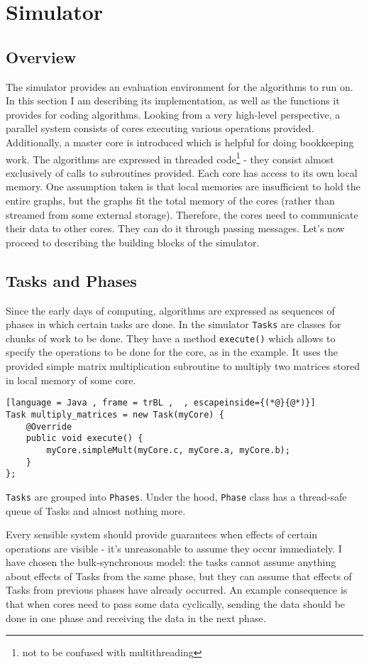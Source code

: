 \documentclass[12pt,a4paper,twoside,openright]{report}
\begin{document}
\section{Simulator}
\subsection{Overview}
The simulator provides an evaluation environment for the algorithms to run on. In this section I am describing its implementation, as well as the functions it provides for coding algorithms. Looking from a very high-level perspective, a parallel system consists of cores executing various operations provided. Additionally, a master core is introduced which is helpful for doing bookkeeping work.
The algorithms are expressed in threaded code\footnote{not to be confused with multithreading} - they consist almost exclusively of calls to subroutines provided. Each core has access to its own local memory. One assumption taken is that local memories are insufficient to hold the entire graphs, but the graphs fit the total memory of the cores (rather than streamed from some external storage). Therefore, the cores need to communicate their data to other cores. They can do it through passing messages. Let's now proceed to describing the building blocks of the simulator.

\subsection{Tasks and Phases}
Since the early days of computing, algorithms are expressed as sequences of phases in which certain tasks are done. In the simulator \texttt{Tasks} are classes for chunks of work to be done. They have a method \texttt{execute()} which allows to specify the operations to be done for the core, as in the example. It uses the provided simple matrix multiplication subroutine to multiply two matrices stored in local memory of some core. 

\begin{lstlisting}[language = Java , frame = trBL ,  , escapeinside={(*@}{@*)}]
Task multiply_matrices = new Task(myCore) {
    @Override
    public void execute() {
        myCore.simpleMult(myCore.c, myCore.a, myCore.b);
    }
};
\end{lstlisting}


\texttt{Tasks} are grouped into \texttt{Phases}. Under the hood, \texttt{Phase} class has a thread-safe queue of Tasks and almost nothing more.

Every sensible system should provide guarantees when effects of certain operations are visible - it's unreasonable to assume they occur immediately. I have chosen the bulk-synchronous model: the tasks cannot assume anything about effects of Tasks from the same phase, but they can assume that effects of Tasks from previous phases have already occurred. An example consequence is that when cores need to pass some data cyclically, sending the data should be done in one phase and receiving the data in the next phase.
\end{document}
